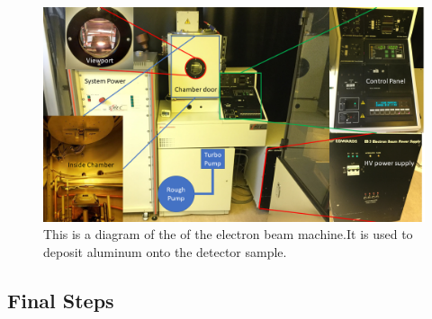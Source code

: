 \begin{figure}
\includegraphics[width=\textwidth]{figures/ebeam-flow}
\caption{This is a diagram of the of the electron beam machine.It is used to deposit aluminum onto the detector sample.}
\label{LandscapeFigure}
\end{figure}


\subsection{Final Steps}
